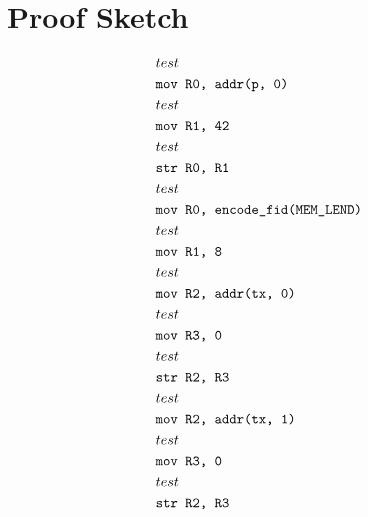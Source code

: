 \documentclass{article}
\begin{document}
\section{Proof Sketch}

\begin{align*}
  &{
test
  }\\&\texttt{{mov R0, addr(p, 0)}}\\
 &{
  test
  }\\&\texttt{{mov R1, 42}}\\
&{
  test
  }\\&\texttt{{str R0, R1}}\\
&{
  test
  }\\&\texttt{{mov R0, encode\_fid(MEM\_LEND)}}\\
&{
  test
  }\\&\texttt{{mov R1, 8}}\\
&{
  test
  }\\&\texttt{{mov R2, addr(tx, 0)}}\\
&{
  test
  }\\&\texttt{{mov R3, 0}}\\
&{
  test
  }\\&\texttt{{str R2, R3}}\\
&{
  test
  }\\&\texttt{{mov R2, addr(tx, 1)}}\\
&{
  test
  }\\&\texttt{{mov R3, 0}}\\
&{
  test
  }\\&\texttt{{str R2, R3}}\\
  \end{align*}
\end{document}
